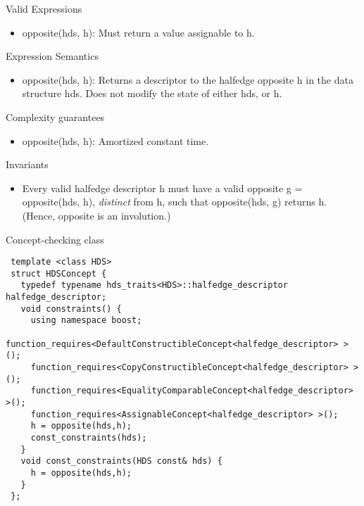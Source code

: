 \begin{Desc}
\item[Valid Expressions]\begin{itemize}
\item opposite(hds, h): Must return a value assignable to h.\end{itemize}
\end{Desc}
\begin{Desc}
\item[Expression Semantics]\begin{itemize}
\item opposite(hds, h): Returns a descriptor to the halfedge opposite h in the data structure hds. Does not modify the state of either hds, or h.\end{itemize}
\end{Desc}
\begin{Desc}
\item[Complexity guarantees]\begin{itemize}
\item opposite(hds, h): Amortized constant time.\end{itemize}
\end{Desc}
\begin{Desc}
\item[Invariants]\begin{itemize}
\item Every valid halfedge descriptor h must have a valid opposite g = opposite(hds, h), {\em distinct\/} from h, such that opposite(hds, g) returns h. (Hence, opposite is an involution.)\end{itemize}
\end{Desc}
\begin{Desc}
\item[Concept-checking class]

\begin{Code}\begin{verbatim} template <class HDS> 
 struct HDSConcept {
   typedef typename hds_traits<HDS>::halfedge_descriptor halfedge_descriptor; 
   void constraints() {
     using namespace boost;
     function_requires<DefaultConstructibleConcept<halfedge_descriptor> >();
     function_requires<CopyConstructibleConcept<halfedge_descriptor> >();
     function_requires<EqualityComparableConcept<halfedge_descriptor> >();
     function_requires<AssignableConcept<halfedge_descriptor> >();
     h = opposite(hds,h);
     const_constraints(hds);
   }
   void const_constraints(HDS const& hds) {
     h = opposite(hds,h);
   }
 };
\end{verbatim}\end{Code}

 \end{Desc}
